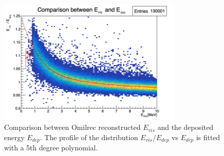 \documentclass[../main.tex]{subfiles}
\begin{document}
\begin{figure}[ht]
  \centering
  \includegraphics[height=6cm]{images/jgnn/e_rec_e_true_comp.png}
  \caption{Comparison between Omilrec reconstructed $E_{vis}$ and the deposited energy $E_{dep}$. The profile of the distribution $E_{vis}/E_{dep}$ vs $E_{dep}$ is fitted with a 5th degree polynomial.}
  \label{fig:annex:evis:e_rec_correction}
\end{figure}
\end{document}
